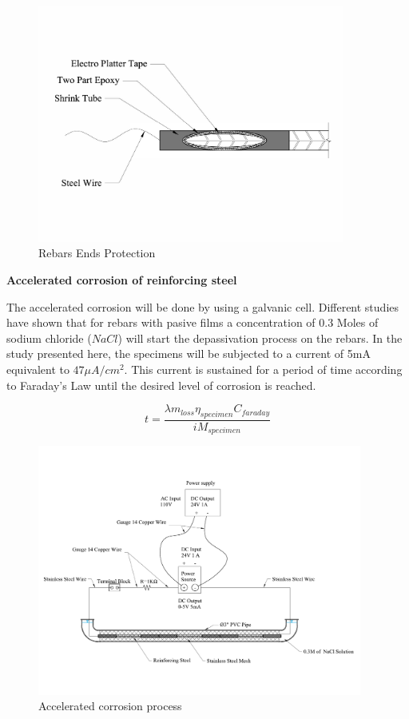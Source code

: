 \begin{figure}[htbp]
	\centering
	\includegraphics[width=0.9\textwidth]{Chapter-3/figs/Rebar_Ends}
	\caption{Rebars Ends Protection}
	\label{fig:RebarEndsProtection}
\end{figure}

\newpage
\textbf{Accelerated corrosion  of reinforcing steel}

The accelerated corrosion will be done by using a galvanic cell. Different studies \cite{Ghods2010} have shown that for rebars with pasive films a concentration of 0.3 Moles of sodium chloride ($NaCl$) will start the depassivation process on the rebars. In the study presented here, the specimens will be subjected to a current of 5mA equivalent to $47\mu A/cm^2$. This current is sustained for a period of time according to Faraday's Law until the desired level of corrosion is reached.

\begin{equation}
	t=\frac{\lambda m_{loss} \eta_{specimen} C_{faraday}}{i M_{specimen}}
	\label{eq.FaradayEq}
\end{equation}

\begin{figure}[htbp]
	\centering
	\includegraphics[width=0.95\textwidth]{Chapter-3/figs/AcceleratedCorrosionProcedure}
	\caption{Accelerated corrosion process}
	\label{fig:AcceleratedCorrosion}
\end{figure}

